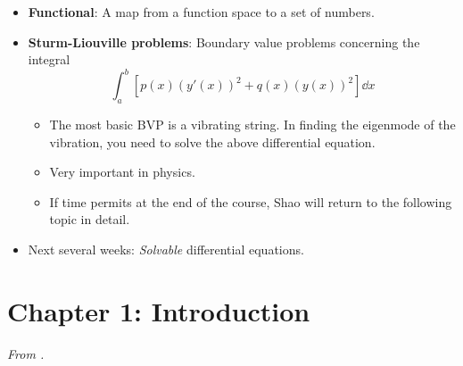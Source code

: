 \documentclass[../notes.tex]{subfiles}
\begin{document}
\begin{itemize}
\begin{itemize}
    \end{itemize}
    \item \textbf{Functional}: A map from a function space to a set of numbers.
    \item \textbf{Sturm-Liouville problems}: Boundary value problems concerning the integral
    \begin{equation*}
        \int_a^b\left[ p(x)(y'(x))^2+q(x)(y(x))^2 \right]\dd{x}
    \end{equation*}
    \begin{itemize}
        \item The most basic BVP is a vibrating string. In finding the eigenmode of the vibration, you need to solve the above differential equation.
        \item Very important in physics.
        \item If time permits at the end of the course, Shao will return to the following topic in detail.
    \end{itemize}
    \item Next several weeks: \emph{Solvable} differential equations.
\end{itemize}



\section{Chapter 1: Introduction}
\emph{From \textcite{bib:Teschl}.}
\end{document}
